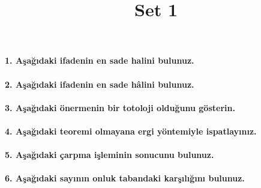 \documentclass[
]{article}
\title{Set 1}
\author{}
\date{}
\begin{document}
\maketitle

\paragraph{\texorpdfstring{\textbf{1.} Aşağıdaki ifadenin en sade halini
bulunuz.}{1. Aşağıdaki ifadenin en sade halini bulunuz.}}\label{aux15faux11fux131daki-ifadenin-en-sade-halini-bulunuz.}

\paragraph{\texorpdfstring{\textbf{2.} Aşağıdaki ifadenin en sade hâlini
bulunuz.}{2. Aşağıdaki ifadenin en sade hâlini bulunuz.}}\label{aux15faux11fux131daki-ifadenin-en-sade-huxe2lini-bulunuz.}

\paragraph{\texorpdfstring{\textbf{3}. Aşağıdaki önermenin bir totoloji
olduğunu
gösterin.}{3. Aşağıdaki önermenin bir totoloji olduğunu gösterin.}}\label{aux15faux11fux131daki-uxf6nermenin-bir-totoloji-olduux11funu-guxf6sterin.}

\paragraph{\texorpdfstring{\textbf{4.} Aşağıdaki teoremi olmayana ergi
yöntemiyle
ispatlayınız.}{4. Aşağıdaki teoremi olmayana ergi yöntemiyle ispatlayınız.}}\label{aux15faux11fux131daki-teoremi-olmayana-ergi-yuxf6ntemiyle-ispatlayux131nux131z.}

\paragraph{\texorpdfstring{\textbf{5.} Aşağıdaki çarpma işleminin
sonucunu
bulunuz.}{5. Aşağıdaki çarpma işleminin sonucunu bulunuz.}}\label{aux15faux11fux131daki-uxe7arpma-iux15fleminin-sonucunu-bulunuz.}

\paragraph{\texorpdfstring{\textbf{6.} Aşağıdaki sayının onluk tabandaki
karşılığını
bulunuz.}{6. Aşağıdaki sayının onluk tabandaki karşılığını bulunuz.}}\label{aux15faux11fux131daki-sayux131nux131n-onluk-tabandaki-karux15fux131lux131ux11fux131nux131-bulunuz.}
\end{document}
